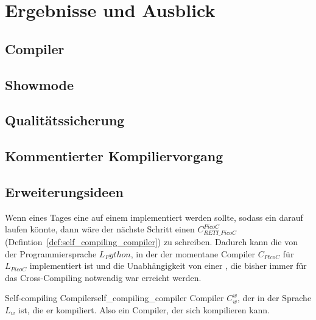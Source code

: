 
\chapter{Ergebnisse und Ausblick}
\label{ch:ergebnisse_und_ausblick}

\section{Compiler}
\section{Showmode}
\section{Qualitätssicherung}
\label{sec:qualitätssicherung}
\section{Kommentierter Kompiliervorgang}
\section{Erweiterungsideen}
Wenn eines Tages eine  auf einem  implementiert werden sollte, sodass ein  darauf laufen könnte, dann wäre der nächste Schritt einen  $C_{RETI\_PicoC}^{PicoC}$ (Defintion~\ref{def:self_compiling_compiler}) zu schreiben. Dadurch kann die  von der Programmiersprache $L_Python$, in der der momentane Compiler $C_{PicoC}$ für $L_{PicoC}$ implementiert ist und die Unabhängigkeit von einer , die bisher immer für das Cross-Compiling notwendig war erreicht werden.

\begin{Definition}{Self-compiling Compiler}{self_compiling_compiler}
  Compiler $C_w^w$, der in der Sprache $L_w$  ist, die er  kompiliert. Also ein Compiler, der sich  kompilieren kann.
\end{Definition}

